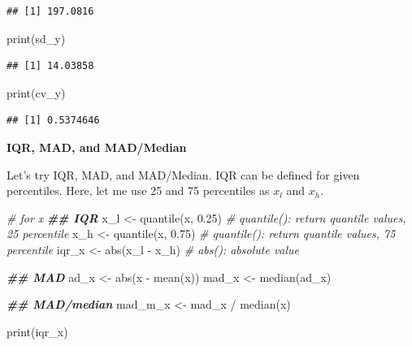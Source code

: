 \documentclass[
]{article}
\newenvironment{Shaded}{\begin{snugshade}}{\end{snugshade}}
\newcommand{\CommentTok}[1]{\textcolor[rgb]{0.56,0.35,0.01}{\textit{#1}}}
\newcommand{\DocumentationTok}[1]{\textcolor[rgb]{0.56,0.35,0.01}{\textbf{\textit{#1}}}}
\newcommand{\FloatTok}[1]{\textcolor[rgb]{0.00,0.00,0.81}{#1}}
\newcommand{\FunctionTok}[1]{\textcolor[rgb]{0.00,0.00,0.00}{#1}}
\newcommand{\NormalTok}[1]{#1}
\newcommand{\OtherTok}[1]{\textcolor[rgb]{0.56,0.35,0.01}{#1}}
\newcommand{\SpecialCharTok}[1]{\textcolor[rgb]{0.00,0.00,0.00}{#1}}
\begin{document}
\begin{verbatim}
## [1] 197.0816
\end{verbatim}

\begin{Shaded}
\begin{Highlighting}[]
\FunctionTok{print}\NormalTok{(sd\_y)}
\end{Highlighting}
\end{Shaded}

\begin{verbatim}
## [1] 14.03858
\end{verbatim}

\begin{Shaded}
\begin{Highlighting}[]
\FunctionTok{print}\NormalTok{(cv\_y)}
\end{Highlighting}
\end{Shaded}

\begin{verbatim}
## [1] 0.5374646
\end{verbatim}

\textbf{IQR, MAD, and MAD/Median}

Let's try IQR, MAD, and MAD/Median. IQR can be defined for given percentiles. Here, let me use 25 and 75 percentiles as \(x_l\) and \(x_h\).

\begin{Shaded}
\begin{Highlighting}[]
\CommentTok{\# for x}
\DocumentationTok{\#\# IQR}
\NormalTok{x\_l }\OtherTok{\textless{}{-}} \FunctionTok{quantile}\NormalTok{(x, }\FloatTok{0.25}\NormalTok{) }\CommentTok{\# quantile(): return quantile values, 25 percentile}
\NormalTok{x\_h }\OtherTok{\textless{}{-}} \FunctionTok{quantile}\NormalTok{(x, }\FloatTok{0.75}\NormalTok{) }\CommentTok{\# quantile(): return quantile values, 75 percentile}
\NormalTok{iqr\_x }\OtherTok{\textless{}{-}} \FunctionTok{abs}\NormalTok{(x\_l }\SpecialCharTok{{-}}\NormalTok{ x\_h) }\CommentTok{\# abs(): absolute value}

\DocumentationTok{\#\# MAD}
\NormalTok{ad\_x }\OtherTok{\textless{}{-}} \FunctionTok{abs}\NormalTok{(x }\SpecialCharTok{{-}} \FunctionTok{mean}\NormalTok{(x))}
\NormalTok{mad\_x }\OtherTok{\textless{}{-}} \FunctionTok{median}\NormalTok{(ad\_x)}

\DocumentationTok{\#\# MAD/median}
\NormalTok{mad\_m\_x }\OtherTok{\textless{}{-}}\NormalTok{ mad\_x }\SpecialCharTok{/} \FunctionTok{median}\NormalTok{(x)}

\FunctionTok{print}\NormalTok{(iqr\_x)}
\end{Highlighting}
\end{Shaded}
\end{document}

